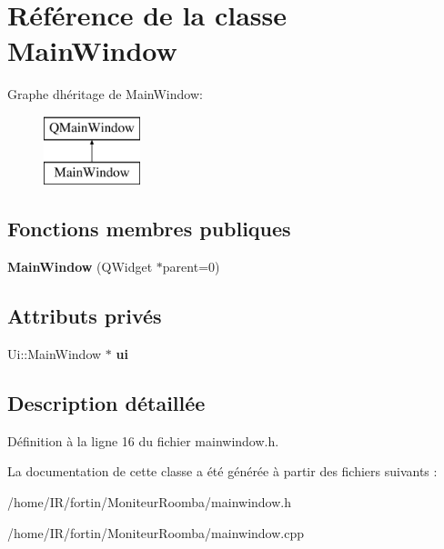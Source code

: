 \hypertarget{class_main_window}{}\section{Référence de la classe Main\+Window}
\label{class_main_window}
Graphe d\textquotesingle{}héritage de Main\+Window\+:\begin{figure}[H]
\begin{center}
\leavevmode
\includegraphics[height=2.000000cm]{class_main_window}
\end{center}
\end{figure}
\subsection*{Fonctions membres publiques}
\begin{DoxyCompactItemize}
\item 
{\bfseries Main\+Window} (Q\+Widget $\ast$parent=0)\hypertarget{class_main_window_a8b244be8b7b7db1b08de2a2acb9409db}{}\label{class_main_window_a8b244be8b7b7db1b08de2a2acb9409db}

\end{DoxyCompactItemize}
\subsection*{Attributs privés}
\begin{DoxyCompactItemize}
\item 
Ui\+::\+Main\+Window $\ast$ {\bfseries ui}\hypertarget{class_main_window_a35466a70ed47252a0191168126a352a5}{}\label{class_main_window_a35466a70ed47252a0191168126a352a5}

\end{DoxyCompactItemize}


\subsection{Description détaillée}


Définition à la ligne 16 du fichier mainwindow.\+h.



La documentation de cette classe a été générée à partir des fichiers suivants \+:\begin{DoxyCompactItemize}
\item 
/home/\+I\+R/fortin/\+Moniteur\+Roomba/mainwindow.\+h\item 
/home/\+I\+R/fortin/\+Moniteur\+Roomba/mainwindow.\+cpp\end{DoxyCompactItemize}

